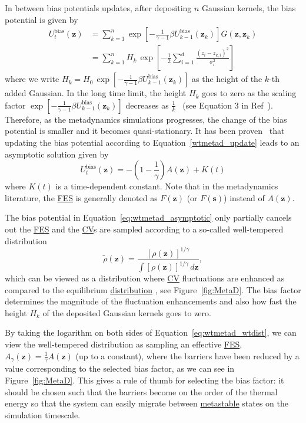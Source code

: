 \documentclass[9pt,review]{livecoms}
\newcommand{\vz}{\mathbf{z}}
\begin{document}
In between bias potentials updates, after depositing $n$ Gaussian kernels, the bias potential is given by
\begin{align}
\label{wtmetad_sum}
U_{t}^{\mathrm{bias}}(\vz) &=
\sum_{k=1}^{n}
\exp \left[-\frac{1}{\gamma-1} \beta  U^{\mathrm{bias}}_{k-1}(\vz_k)\right]
G(\vz,\vz_{k})
\nonumber
\\
& =
\sum_{k=1}^{n}
H_{k} \,
\exp \left[-\frac{1}{2}\sum^{d}_{i=1} \frac{(z_i-z_{k,i})^2}{\sigma^2_i} \right]
\end{align}
where we write $H_{k} = H_{0} \, \exp \left[-\frac{1}{\gamma-1} \beta U^{\mathrm{bias}}_{k-1}(\vz_k)\right]$ as the height of the $k$-th added Gaussian.
In the long time limit, the height $H_k$ goes to zero as the scaling factor $\exp \left[-\frac{1}{\gamma-1} \beta U^{\mathrm{bias}}_{k-1}(\vz_k)   \right]$ decreases as $\frac{1}{k}$~\cite{Barducci-PRL-2008,Dama-PRL-2014} (see Equation 3 in Ref~\cite{Barducci-PRL-2008}). Therefore, as the metadynamics simulations progresses, the change of the bias potential is smaller and it becomes quasi-stationary.
It has been proven~\cite{Dama-PRL-2014} that updating the bias potential according to Equation~\ref{wtmetad_update} leads to an asymptotic solution given by
\begin{equation}
\label{eq:wtmetad_asymptotic}
U_{t}^{\mathrm{bias}}(\vz) = - \left(1-\frac{1}{\gamma} \right)
A(\vz) + K(t)
\end{equation}
where $K(t)$ is a time-dependent constant.
Note that in the metadynamics literature, the \hyperlink{ref:FES} {FES} is generally denoted as $F(\vz)$ (or $F(\mathbf{s})$) instead of $A(\vz)$.


The bias potential in Equation~\ref{eq:wtmetad_asymptotic} only partially cancels out the \hyperlink{ref:FES} {FES} and the \hyperlink{ref:CV} {CV}s  are sampled according to a so-called well-tempered distribution
\begin{equation}
\label{eq:wtmetad_wtdist}
\tilde{\rho}(\vz) =
\frac
{[\rho(\vz)]^{1/\gamma}}
{\int [\rho(\vz)]^{1/\gamma} \, d\vz},
\end{equation}
which can be viewed as a distribution where \hyperlink{ref:CV} {CV} fluctuations are enhanced as compared to the equilibrium \hyperlink{ref:Distribution} {distribution} , see Figure~\ref{fig:MetaD}. The bias factor determines the magnitude of the fluctuation enhancements and also how fast the height $H_{k}$ of the deposited Gaussian kernels goes to zero.

By taking the logarithm on both sides of Equation~\ref{eq:wtmetad_wtdist}, we can view the well-tempered distribution as sampling an effective \hyperlink{ref:FES} {FES},  $A_{\gamma}(\vz) = \frac{1}{\gamma} A(\vz)$ (up to a constant), where the barriers have been reduced by a value corresponding to the selected bias factor, as we can see in Figure~\ref{fig:MetaD}. This gives a rule of thumb for selecting the bias factor: it should be chosen such that the barriers become on the order of the thermal energy so that the system can easily migrate between \hyperlink{ref:metastab} {metastable} states on the simulation timescale.
\end{document}
